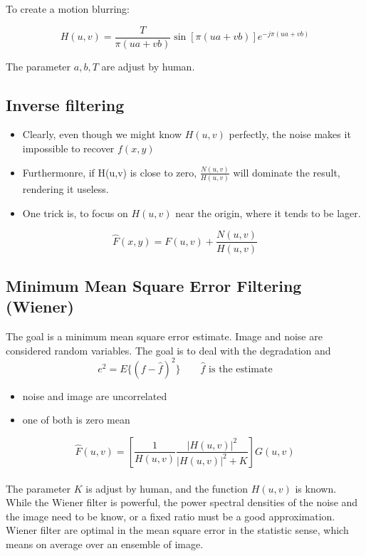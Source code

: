 To create a motion blurring:

\begin{equation}
	H(u,v) = \frac{T}{\pi (ua + vb)}\sin[\pi (ua + vb)] e^{-j \pi(ua + vb)}
\end{equation}

The parameter $a,b,T$ are adjust by human.

\subsection{Inverse filtering }

\begin{itemize}
	\item Clearly, even though we might know $H(u,v)$ perfectly, the noise makes it impossible to recover $f(x,y)$
	\item Furthermonre, if H(u,v) is close to zero, $\frac{N(u,v)}{H(u,v)}$ will dominate the result, rendering it useless.
	\item One trick is, to focus on $H(u,v)$ near the origin, where it tends to be lager.
\end{itemize}

\begin{equation}
	\hat{F}(x,y)= F(u,v) + \frac{N(u,v)}{H(u,v)}
\end{equation}


\subsection{Minimum Mean Square Error Filtering (Wiener) }
The goal is a minimum mean square error estimate. Image and noise are considered random variables. The goal is to deal with the degradation and 
\begin{equation}
	e^2 = E\{(f- \hat{f})^2 \} \qquad \hat{f} \text{ is the estimate}
\end{equation}

\begin{itemize}
	\item noise and image are uncorrelated
	\item one of both is zero mean
\end{itemize}

\begin{equation}
	\hat{F}(u,v) = \left[ \frac{1}{H(u,v)} \frac{|H(u,v)|^2}{|H(u,v)|^2 +K} \right] G(u,v)
\end{equation}\\

The parameter $K$ is adjust by human, and the function $H(u,v)$ is known.
While the Wiener filter is powerful, the power spectral densities of the noise and the image need to be know, or a fixed ratio must be a good approximation. Wiener filter are optimal in the mean square error in the statistic sense, which means on average over an ensemble of image.

